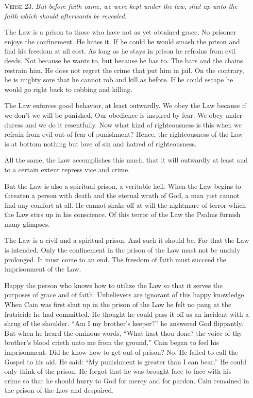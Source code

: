 \textsc{Verse} 23. \emph{But before faith came, we were kept under the law, shut up unto the faith which should afterwards be revealed.}

The Law is a prison to those who have not as yet obtained grace. No prisoner enjoys the confinement. He hates it. If he could he would smash the prison and find his freedom at all cost. As long as he stays in prison he refrains from evil deeds. Not because he wants to, but because he has to. The bars and the chains restrain him. He does not regret the crime that put him in jail. On the contrary, he is mighty sore that he cannot rob and kill as before. If he could escape he would go right back to robbing and killing.

The Law enforces good behavior, at least outwardly. We obey the Law because if we don’t we will be punished. Our obedience is inspired by fear. We obey under duress and we do it resentfully. Now what kind of righteousness is this when we refrain from evil out of fear of punishment? Hence, the righteousness of the Law is at bottom nothing but love of sin and hatred of righteousness.

All the same, the Law accomplishes this much, that it will outwardly at least and to a certain extent repress vice and crime.

But the Law is also a spiritual prison, a veritable hell. When the Law begins to threaten a person with death and the eternal wrath of God, a man just cannot find any comfort at all. He cannot shake off at will the nightmare of terror which the Law stirs up in his conscience. Of this terror of the Law the Psalms furnish many glimpses.

The Law is a civil and a spiritual prison. And such it should be. For that the Law is intended. Only the confinement in the prison of the Law must not be unduly prolonged. It must come to an end. The freedom of faith must succeed the imprisonment of the Law.

Happy the person who knows how to utilize the Law so that it serves the purposes of grace and of faith. Unbelievers are ignorant of this happy knowledge. When Cain was first shut up in the prison of the Law he felt no pang at the fratricide he had committed. He thought he could pass it off as an incident with a shrug of the shoulder. “Am I my brother’s keeper?” he answered God flippantly. But when he heard the ominous words, “What hast thou done? the voice of thy brother’s blood crieth unto me from the ground,” Cain began to feel his imprisonment. Did he know how to get out of prison? No. He failed to call the Gospel to his aid. He said: “My punishment is greater than I can bear.” He could only think of the prison. He forgot that he was brought face to face with his crime so that he should hurry to God for mercy and for pardon. Cain remained in the prison of the Law and despaired.


